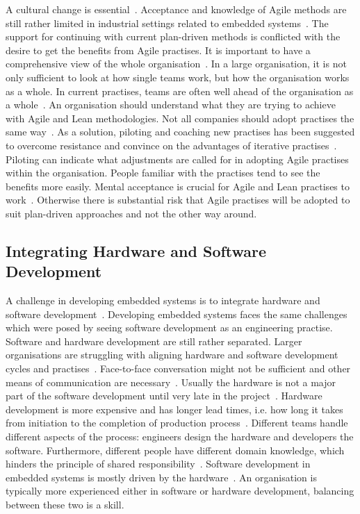 \documentclass[english]{tktltiki2}
\begin{document}
A cultural change is essential~\cite{HAB12, KRM13}. Acceptance and knowledge of Agile methods are still rather limited in industrial settings related to embedded systems~\cite{HMP12}. The support for continuing with current plan-driven methods is conflicted with the desire to get the benefits from Agile practises. It is important to have a comprehensive view of the whole organisation~\cite{KRM13}. In a large organisation, it is not only sufficient to look at how single teams work, but how the organisation works as a whole. In current practises, teams are often well ahead of the organisation as a whole~\cite{HAB12}. An organisation should understand what they are trying to achieve with Agile and Lean methodologies. Not all companies should adopt practises the same way~\cite{KRM13}. As a solution, piloting and coaching new practises has been suggested to overcome resistance and convince on the advantages of iterative practises~\cite{CWR10, EB12, HMP12, KRM13}. Piloting can indicate what adjustments are called for in adopting Agile practises within the organisation. People familiar with the practises tend to see the benefits more easily. Mental acceptance is crucial for Agile and Lean practises to work~\cite{HMP12}. Otherwise there is substantial risk that Agile practises will be adopted to suit plan-driven approaches and not the other way around.

\subsection{Integrating Hardware and Software Development}

A challenge in developing embedded systems is to integrate hardware and software development~\cite{EB12, EHS14}. Developing embedded systems faces the same challenges which were posed by seeing software development as an engineering practise. Software and hardware development are still rather separated. Larger organisations are struggling with aligning hardware and software development cycles and practises~\cite{EHS14}. Face-to-face conversation might not be sufficient and other means of communication are necessary~\cite{RA03}. Usually the hardware is not a major part of the software development until very late in the project~\cite{RA03}. Hardware development is more expensive and has longer lead times, i.e. how long it takes from initiation to the completion of production process~\cite{EHS14}. Different teams handle different aspects of the process: engineers design the hardware and developers the software. Furthermore, different people have different domain knowledge, which hinders the principle of shared responsibility~\cite{KRM13, EHS14}. Software development in embedded systems is mostly driven by the hardware~\cite{BE12}. An organisation is typically more experienced either in software or hardware development, balancing between these two is a skill.
\end{document}
